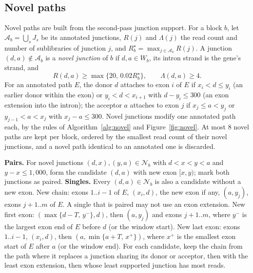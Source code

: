 \documentclass[11pt]{article}
\begin{document}
\subsection{Novel paths}
\label{sec:novel}

Novel paths are built from the second-pass junction support. For a block $b$, let $\mathcal A_b=\bigcup_sJ_s$ be its annotated junctions, $R(j)$ and $\Lambda(j)$ the read count and number of sublibraries of junction $j$, and $R_b^\star=\max_{j\in\mathcal A_b}R(j)$. A junction $(d,a)\notin\mathcal A_b$ is a \emph{novel junction} of $b$ if $d,a\in W_b$, its intron strand is the gene's strand, and \[R(d,a)\ge\max\{20,\,0.02R_b^\star\},\qquad \Lambda(d,a)\ge4.\] For an annotated path $E$, the donor $d$ attaches to exon $i$ of $E$ if $x_i<d\le y_i$ (an earlier donor within the exon) or $y_i<d<x_{i+1}$ with $d-y_i\le300$ (an exon extension into the intron); the acceptor $a$ attaches to exon $j$ if $x_j\le a<y_j$ or $y_{j-1}<a<x_j$ with $x_j-a\le300$. Novel junctions modify one annotated path each, by the rules of Algorithm~\ref{alg:novel} and Figure~\ref{fig:novel}. At most 8 novel paths are kept per block, ordered by the smallest read count of their novel junctions, and a novel path identical to an annotated one is discarded.

\begin{algorithm}[ht]
\caption{Novel paths of block $b$ from its novel junctions $\mathcal N_b$; $T=151$ is the new terminal exon length.}
\label{alg:novel}
\begin{algorithmic}[1]
\State \textbf{Pairs.} For novel junctions $(d,x),(y,a)\in\mathcal N_b$ with $d<x<y<a$ and $y-x\le1{,}000$, form the candidate $(d,a)$ with new exon $[x,y)$; mark both junctions as paired.
\State \textbf{Singles.} Every $(d,a)\in\mathcal N_b$ is also a candidate without a new exon.
    \State New chain: exons $1..i-1$ of $E$, $(x_i,d)$, the new exon if any, $(a,y_j)$, exons $j+1..m$ of $E$. A single that is paired may not use an exon extension.
    \State New first exon: $(\max\{d-T,\,y^-\},d)$, then $(a,y_j)$ and exons $j+1..m$, where $y^-$ is the largest exon end of $E$ before $d$ (or the window start).
    \State New last exon: exons $1..i-1$, $(x_i,d)$, then $(a,\min\{a+T,\,x^+\})$, where $x^+$ is the smallest exon start of $E$ after $a$ (or the window end).
  \EndIf
\EndFor
\State For each candidate, keep the chain from the path where it replaces a junction sharing its donor or acceptor, then with the least exon extension, then whose least supported junction has most reads.
\end{algorithmic}
\end{algorithm}
\end{document}
